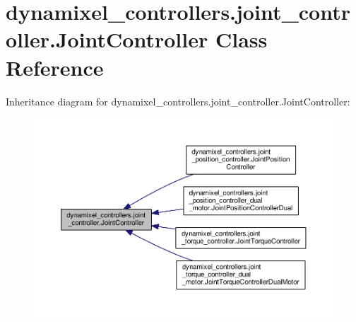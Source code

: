 \hypertarget{classdynamixel__controllers_1_1joint__controller_1_1_joint_controller}{}\section{dynamixel\+\_\+controllers.\+joint\+\_\+controller.\+Joint\+Controller Class Reference}
\label{classdynamixel__controllers_1_1joint__controller_1_1_joint_controller}


Inheritance diagram for dynamixel\+\_\+controllers.\+joint\+\_\+controller.\+Joint\+Controller\+:
\nopagebreak
\begin{figure}[H]
\begin{center}
\leavevmode
\includegraphics[width=350pt]{d5/d30/classdynamixel__controllers_1_1joint__controller_1_1_joint_controller__inherit__graph}
\end{center}
\end{figure}
